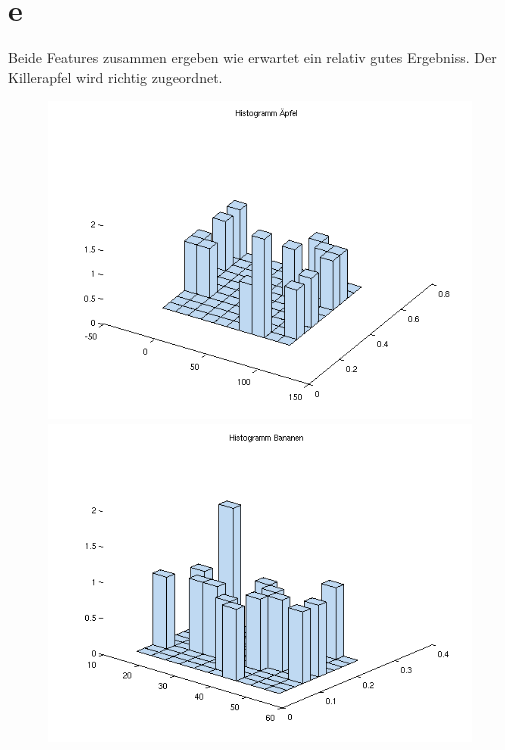 \documentclass[a4paper,10pt]{article}
\begin{document}
\section{e}
Beide Features zusammen ergeben wie erwartet ein relativ gutes Ergebniss. Der Killerapfel wird richtig zugeordnet.
\begin{figure}[htbp]
  \centering
    \includegraphics[width=1\linewidth]{plot5.png}
    \includegraphics[width=1\linewidth]{plot6.png}
\end{figure}
\end{document}

